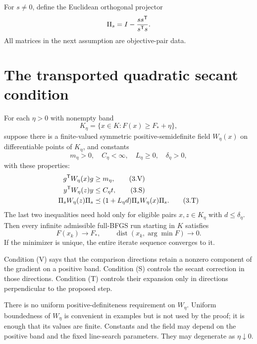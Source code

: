 For $s\ne0$, define the Euclidean orthogonal projector
\[
 \Pi_s=I-\frac{ss^{\mathsf T}}{s^{\mathsf T} s}.
\]
All matrices in the next assumption are objective-pair data.


\setcounter{section}{2}
\setcounter{theorem}{0}
\setcounter{lemma}{0}
\setcounter{corollary}{0}
\setcounter{proposition}{0}
\setcounter{remark}{0}
\setcounter{equation}{3}


\section{The transported quadratic secant condition}

\begin{theorem}
For each $\eta>0$ with nonempty band
\[
 K_\eta=\{x\in K:F(x)\ge F_*+\eta\},
\]
suppose there is a finite-valued symmetric positive-semidefinite field $W_\eta(x)$ on differentiable points of $K_\eta$, and constants
\[
 m_\eta>0,\quad C_\eta<\infty,\quad L_\eta\ge0,\quad \delta_\eta>0,
\]
with these properties:
\begin{align}
 g^{\mathsf T} W_\eta(x)g&\ge m_\eta, \tag{3.V}\\
 y^{\mathsf T} W_\eta(z)y&\le C_\eta t, \tag{3.S}\\
 \Pi_s W_\eta(z)\Pi_s&\preceq
 (1+L_\eta d)\Pi_s W_\eta(x)\Pi_s. \tag{3.T}
\end{align}
The last two inequalities need hold only for eligible pairs $x,z\in K_\eta$ with $d\le\delta_\eta$. Then every infinite admissible full-BFGS run starting in $K$ satisfies
\[
 F(x_k)\to F_*,\qquad \operatorname{dist}(x_k,\arg\min F)\to0.
\]
If the minimizer is unique, the entire iterate sequence converges to it.
\end{theorem}
Condition (V) says that the comparison directions retain a nonzero component of the gradient on a positive band. Condition (S) controls the secant correction in those directions. Condition (T) controls their expansion only in directions perpendicular to the proposed step.

There is no uniform positive-definiteness requirement on $W_\eta$. Uniform boundedness of $W_\eta$ is convenient in examples but is not used by the proof; it is enough that its values are finite. Constants and the field may depend on the positive band and the fixed line-search parameters. They may degenerate as $\eta\downarrow0$.



